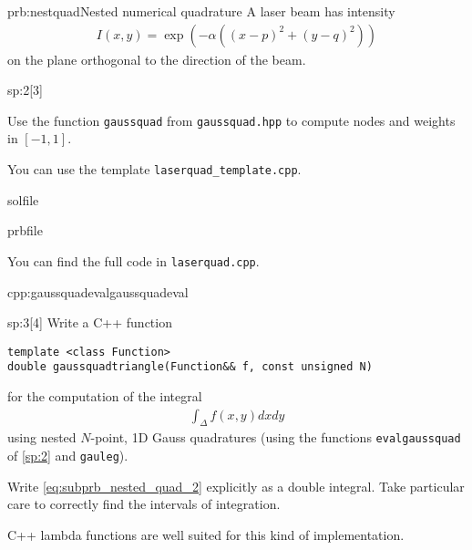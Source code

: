 \begin{samproblem}{prb:nestquad}{Nested numerical quadrature}{
  A laser beam has intensity
  \begin{align*}
    I(x,y) = \exp(- \alpha ((x-p)^2 + (y-q)^2) )
  \end{align*}
  on the plane orthogonal to the direction of the beam.
}
\begin{subproblem}{sp:2}[3]
  \begin{samhint}
    Use the function \verb|gaussquad| from \verb|gaussquad.hpp| to compute nodes and weights in $[-1,1]$.
  \end{samhint}
  
  \begin{samhint}
    You can use the template \verb|laserquad_template.cpp|.
  \end{samhint}
  
  \begin{samwriteprbpart}{solfile}
    \begin{writeverbatim}{prbfile}
      \begin{samsolution}
        You can find the full code in \verb|laserquad.cpp|.

        \begin{samcode}[C++-code]{cpp:gaussquadeval}{gaussquadeval}
          \small
        \end{samcode}
      \end{samsolution}
    \end{writeverbatim}
  \end{samwriteprbpart}

\end{subproblem}

\begin{subproblem}{sp:3}[4]
  Write a C++ function
  \begin{lstlisting}[style=cpp]
template <class Function>
double gaussquadtriangle(Function&& f, const unsigned N)
  \end{lstlisting}
  for the computation of the integral
  \begin{align} \label{eq:subprb_nested_quad_2}
    \int_\Delta f(x,y) dx dy
  \end{align}
  using nested $N$-point, 1D Gauss quadratures (using the functions \verb|evalgaussquad| of \ref{sp:2} and  \verb|gauleg|).
  
  \begin{samhint}
    Write \eqref{eq:subprb_nested_quad_2} explicitly as a double integral. Take particular care to correctly find the intervals of integration.
  \end{samhint}
  
  \begin{samhint}
    C++ lambda functions are well suited for this kind of implementation.
  \end{samhint}


\end{subproblem}
\end{samproblem}

